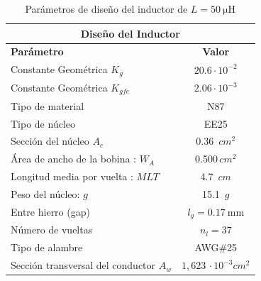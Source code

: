 \documentclass[]{article}
\begin{document}
	
	\begin{table}[H]
		\centering
		\renewcommand{\arraystretch}{1.3}
		\begin{tabular}{|l|c|}
			\hline
			\multicolumn{2}{|c|}{\textbf{Diseño del Inductor}} \\
			\hline
			\textbf{Parámetro} & \textbf{Valor} \\
			\hline
			Constante Geométrica $K_g$ & $20.6 \cdot 10^{-2}$\\
			\hline 
			Constante Geométrica $K_{gfe}$ & $2.06 \cdot 10^{-3}$\\
			\hline
			Tipo de material & N87 \\
			\hline
			Tipo de núcleo & EE25 \\
			\hline 
			Sección del núcleo $A_c$ & 0.36 $\, cm^2 $\\
			\hline 
			Área de ancho de la bobina : $ W_A$ & 0.500$\, cm^2 $\\
			\hline
			Longitud media por vuelta : $MLT $ & 4.7 $\, cm $ \\
			\hline 
			Peso del núcleo: $g$ & 15.1 $\, g$\\
			\hline
			Entre hierro (gap) & $l_g=\SI{0.17}{\milli\meter}$ \\
			\hline
			Número de vueltas & $n_l=37$ \\
			\hline
			Tipo de alambre & AWG\#25 \\
			\hline
			 Sección transversal del conductor $A_w$ & $1,623 \, \cdot 10^{-3} cm^2$\\
			 	\hline
		\end{tabular}
		\caption{Parámetros de diseño del inductor de $L=\SI{50}{\micro\henry}$}
		\label{tab:diseno_inductor}
	\end{table}
	
	
	
\end{document}
